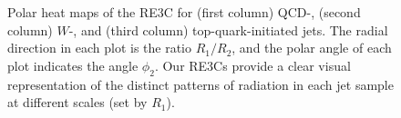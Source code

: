 \begin{figure}
{    }
    \caption[Polar heat maps of the resolved three-point energy corrleator on QCD, \(W\), and top jets.]{
        Polar heat maps of the RE3C for (first column) QCD-, (second column) \(W\)-, and (third column) top-quark-initiated jets.
        The radial direction in each plot is the ratio \(R_1/R_2\), and the polar angle of each plot indicates the angle \(\phi_2\).
        Our RE3Cs provide a clear visual representation of the distinct patterns of radiation in each jet sample at different scales (set by \(R_1\)).
    }
	\label{fig:pythia_re3cs}%
\end{figure}

